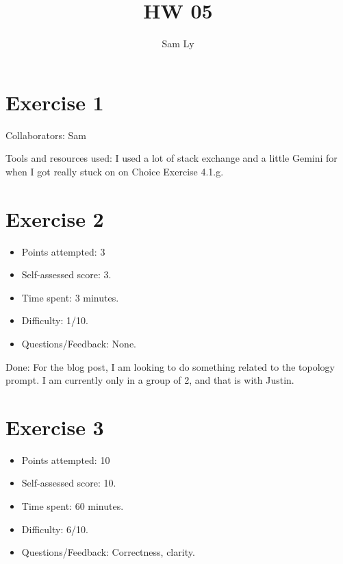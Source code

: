 \documentclass{article}
\title{HW 05}
\author{Sam Ly}
\begin{document}
\maketitle

\section*{Exercise 1}
Collaborators: Sam

\noindent
Tools and resources used: I used a lot of stack exchange and a little Gemini for when 
I got really stuck on on Choice Exercise 4.1.g.
\pagebreak

\section*{Exercise 2}
\begin{itemize}
  \item Points attempted: 3
  \item Self-assessed score: 3.
  \item Time spent: 3 minutes.
  \item Difficulty: 1/10.
  \item Questions/Feedback: None.
\end{itemize}
Done: For the blog post, I am looking to do something related to the topology 
prompt. I am currently only in a group of 2, and that is with Justin.
\pagebreak

\section*{Exercise 3}
\begin{itemize}
  \item Points attempted: 10
  \item Self-assessed score: 10.
  \item Time spent: 60 minutes.
  \item Difficulty: 6/10.
  \item Questions/Feedback: Correctness, clarity.
\end{itemize}
\end{document}
